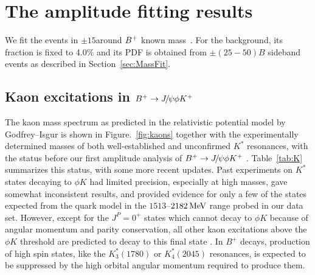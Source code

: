 \def \RM {RM}
\def \IM {IM}
\def \EM {EM}
\newcommand{\upperRomannumeral}[1]{\uppercase\expandafter{\romannumeral#1}}
\newcommand{\lowerromannumeral}[1]{\romannumeral#1\relax}
\clearpage

\section{The amplitude fitting results}
\label{chap:Amplitude}
We fit the events in $\pm15$\mev around ${{{B}^+}}$ known mass~\supercite{PDG}. 
For the background, 
its fraction is fixed to 4.0\% and its PDF is obtained from $\pm(25-50)$\mev $B$ sideband events as described in Section~\ref{sec:MassFit}. 

\subsection{Kaon excitations in ${{{B}^+}}\rightarrow{\ensuremath{{J\mskip -3mu/\mskip -2mu\psi}}}\phi{\ensuremath{{K}^+}}$}

The kaon mass spectrum as predicted in the relativistic potential model by Godfrey--Isgur \supercite{Godfrey:1985xj} is shown in Figure.~\ref{fig:kaons} 
together with the experimentally determined masses of both well-established and unconfirmed $K^*$ resonances, 
with the status before our first amplitude analysis of ${{{B}^+}}\rightarrow{\ensuremath{{J\mskip -3mu/\mskip -2mu\psi}}}\phi{\ensuremath{{K}^+}}$ \supercite{PDG}. 
Table~\ref{tab:K} summarizes this status, with some more recent updates. 
Past experiments on $K^{*}$ states decaying to $\phi K$ \supercite{Armstrong:1982tw,Frame:1985ka,Kwon:1993xb} had limited precision, 
especially at high masses, gave somewhat inconsistent results,
and provided evidence for only a few of the states expected from the quark model in the $1513$--$2182 \text{\,Me\kern -0.1em V}$ range probed in our data set.
However, except for the $J^P=0^+$ states which cannot decay to $\phi K$ because of angular momentum and parity conservation, 
all other kaon excitations above the $\phi K$ threshold are predicted to decay to this final state \supercite{Kokoski:1985is}.
In $B^+$ decays,
production of high spin states, like the $K^*_3(1780)$ or $K^*_4(2045)$ resonances, 
is expected to be suppressed by the high orbital angular momentum required to produce them. 

